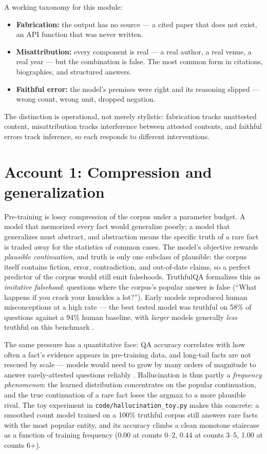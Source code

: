 \documentclass[11pt]{article}
\begin{document}
A working taxonomy for this module:
\begin{itemize}[noitemsep]
  \item \textbf{Fabrication:} the output has no source --- a cited paper that does not exist, an API function that was never written.
  \item \textbf{Misattribution:} every component is real --- a real author, a real venue, a real year --- but the combination is false. The most common form in citations, biographies, and structured answers.
  \item \textbf{Faithful error:} the model's premises were right and its reasoning slipped --- wrong count, wrong unit, dropped negation.
\end{itemize}
The distinction is operational, not merely stylistic: fabrication tracks unattested content, misattribution tracks interference between attested contents, and faithful errors track inference, so each responds to different interventions.

\section{Account 1: Compression and generalization}
Pre-training is lossy compression of the corpus under a parameter budget. A model that memorized every fact would generalize poorly; a model that generalizes must abstract, and abstraction means the specific truth of a rare fact is traded away for the statistics of common cases. The model's objective rewards \emph{plausible continuation}, and truth is only one subclass of plausible: the corpus itself contains fiction, error, contradiction, and out-of-date claims, so a perfect predictor of the corpus would still emit falsehoods. TruthfulQA formalizes this as \emph{imitative falsehood}: questions where the corpus's popular answer is false (``What happens if you crack your knuckles a lot?''). Early models reproduced human misconceptions at a high rate --- the best tested model was truthful on 58\% of questions against a 94\% human baseline, with \emph{larger} models generally \emph{less} truthful on this benchmark \cite{lin2022truthfulqa}.

The same pressure has a quantitative face: QA accuracy correlates with how often a fact's evidence appears in pre-training data, and long-tail facts are not rescued by scale --- models would need to grow by many orders of magnitude to answer rarely-attested questions reliably \cite{kandpal2023longtail}. Hallucination is thus partly a \emph{frequency phenomenon}: the learned distribution concentrates on the popular continuation, and the true continuation of a rare fact loses the argmax to a more plausible rival. The toy experiment in \texttt{code/hallucination\_toy.py} makes this concrete: a smoothed count model trained on a 100\% truthful corpus still answers rare facts with the most popular entity, and its accuracy climbs a clean monotone staircase as a function of training frequency (0.00 at counts 0--2, 0.44 at counts 3--5, 1.00 at counts 6+).
\end{document}
